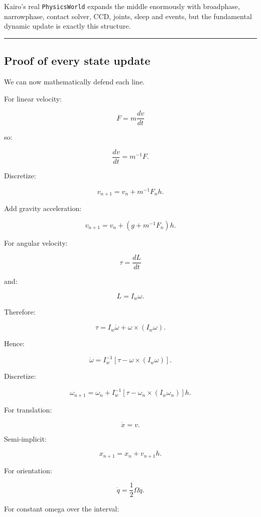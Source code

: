 Kairo's real \texttt{PhysicsWorld} expands the middle enormously with broadphase, narrowphase, contact solver, CCD, joints, sleep and events, but the fundamental dynamic update is exactly this structure.

\begin{center}\rule{0.5\linewidth}{0.5pt}\end{center}

\subsection{Proof of every state update}\label{06-engine-ii-ch039-proof-of-every-state-update}

\hypertarget{06-engine-ii-ch039-proof-of-every-state-update}{}

We can now mathematically defend each line.

For linear velocity:

\[
F=m\frac{dv}{dt}
\]

so:

\[
\frac{dv}{dt}=m^{-1}F.
\]

Discretize:

\[
\boxed{
v_{n+1}
=
v_n+
m^{-1}F_nh.
}
\]

Add gravity acceleration:

\[
\boxed{
v_{n+1}
=
v_n+
(g+m^{-1}F_n)h.
}
\]

For angular velocity:

\[
\tau
=
\frac{dL}{dt}
\]

and:

\[
L=I_w\omega.
\]

Therefore:

\[
\tau
=
I_w\dot\omega+
\omega\times(I_w\omega).
\]

Hence:

\[
\boxed{
\dot\omega
=
I_w^{-1}
[
\tau-
\omega\times(I_w\omega)
].
}
\]

Discretize:

\[
\boxed{
\omega_{n+1}
=
\omega_n+
I_w^{-1}
[
\tau-
\omega_n\times(I_w\omega_n)
]h.
}
\]

For translation:

\[
\dot x=v.
\]

Semi-implicit:

\[
\boxed{
x_{n+1}
=
x_n+
v_{n+1}h.
}
\]

For orientation:

\[
\dot q
=
\frac12\Omega q.
\]

For constant omega over the interval:

